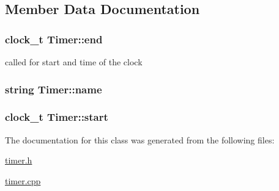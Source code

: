 \subsection{Member Data Documentation}
\hypertarget{class_timer_ab433af761e99696b79826ec49bcd6bb8}{}
\subsubsection[{end}]{\setlength{\rightskip}{0pt plus 5cm}clock\+\_\+t Timer\+::end\hspace{0.3cm}{\ttfamily [private]}}\label{class_timer_ab433af761e99696b79826ec49bcd6bb8}


called for start and time of the clock 

\hypertarget{class_timer_a2ef4db004f703c3225be0b837a159f85}{}
\subsubsection[{name}]{\setlength{\rightskip}{0pt plus 5cm}string Timer\+::name\hspace{0.3cm}{\ttfamily [private]}}\label{class_timer_a2ef4db004f703c3225be0b837a159f85}
\hypertarget{class_timer_a4afa1d4272a81f139af97a6d521079d4}{}
\subsubsection[{start}]{\setlength{\rightskip}{0pt plus 5cm}clock\+\_\+t Timer\+::start\hspace{0.3cm}{\ttfamily [private]}}\label{class_timer_a4afa1d4272a81f139af97a6d521079d4}


The documentation for this class was generated from the following files\+:\begin{DoxyCompactItemize}
\item 
\hyperlink{timer_8h}{timer.\+h}\item 
\hyperlink{timer_8cpp}{timer.\+cpp}\end{DoxyCompactItemize}
